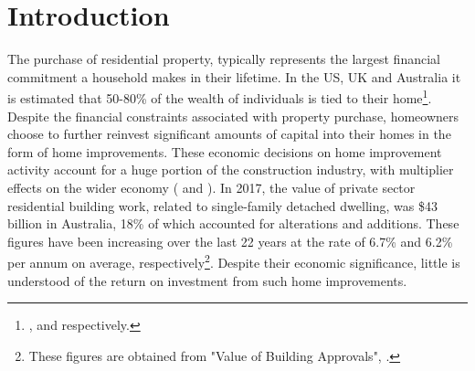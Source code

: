 \documentclass[AEJ,reqno, draftmode]{AEA} %
\begin{document}
\maketitle{}


\section{Introduction}

The purchase of residential property, typically represents the largest financial commitment a household makes in their lifetime. In the US, UK and Australia it is estimated that 50-80\% of the wealth of individuals is tied to their home\footnote{\citet{fed}, \citet{allocuk} and \citet{hilda} respectively.}. Despite the financial constraints associated with property purchase, homeowners choose to further reinvest significant amounts of capital into their homes in the form of home improvements. These economic decisions on home improvement activity account for a huge portion of the construction industry, with multiplier effects on the wider economy (\cite{miles1992housing} and \cite{meffect}). In 2017, the value of private sector residential building work, related to single-family detached dwelling, was \$43 billion in Australia, 18\% of which accounted for alterations and additions. These figures have been increasing over the last 22 years at the rate of 6.7\% and 6.2\% per annum on average, respectively\footnote{These figures are obtained from "Value of Building Approvals", \citet{abs1}.}.  Despite their economic significance, little is understood of the return on investment from such home improvements.


\end{document}
